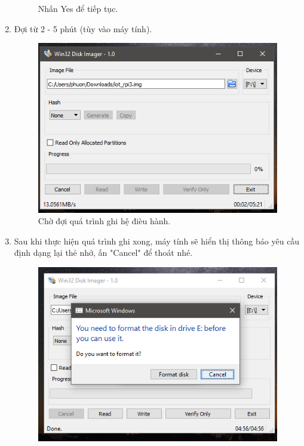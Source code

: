 \begin{enumerate}
\begin{center}
\begin{figure}[htp]
\begin{center}
\end{center}
\caption{Nhấn Yes để tiếp tục.}
\label{refhinh1}
\end{figure}
\end{center}
\newpage
\item Đợi từ 2 - 5 phút (tùy vào máy tính).
\begin{center}
\begin{figure}[htp]
\begin{center}
\includegraphics[scale=0.65]{image3/buoc2cach1s13.png}
\end{center}
\caption{Chờ đợi quá trình ghi hệ đièu hành.}
\label{refhinh1}
\end{figure}
\end{center}
\item Sau khi thực hiện quá trình ghi xong, máy tính sẽ hiển thị thông báo yêu cầu định dạng lại thẻ nhớ, ấn "Cancel" để thoát nhé.
\begin{center}
\begin{figure}[htp]
\begin{center}
\includegraphics[scale=0.65]{image3/buoc2cach1s14.png}

\end{center}
\end{figure}
\end{center}
\end{enumerate}
